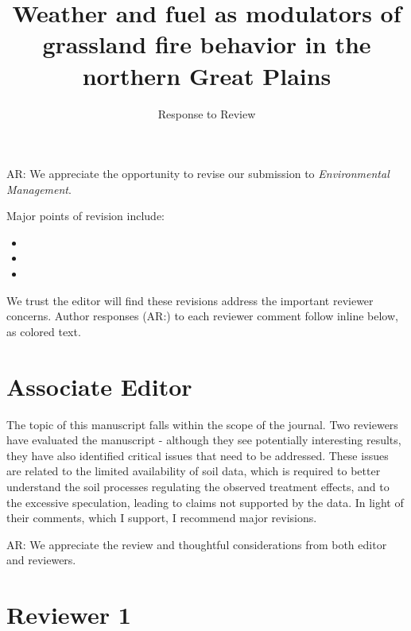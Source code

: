 \documentclass[parskip=half]{scrartcl}
\title{\Large Weather and fuel as modulators of grassland fire behavior in the northern Great Plains}
\subtitle{Response to Review}
\author{ }
\date{}
\newcommand{\AR}[1]
	{\color{PineGreen}AR: #1\color{black} \par }
\begin{document}
\maketitle

\vspace{-2cm} 

\AR{We appreciate the opportunity to revise our submission to \emph{Environmental Management}. 

Major points of revision include: 
\begin{itemize}
\item   
\item 
\item 

\end{itemize} 

We trust the editor will find these revisions address the important reviewer concerns. 
Author responses (AR:) to each reviewer comment follow inline below, as colored text. }

\section*{Associate Editor} 

The topic of this manuscript falls within the scope of the journal. Two reviewers have evaluated the manuscript - although they see potentially interesting results, they have also identified critical issues that need to be addressed. These issues are related to the limited availability of soil data, which is required to better understand the soil processes regulating the observed treatment effects, and to the excessive speculation, leading to claims not supported by the data. In light of their comments, which I support, I recommend major revisions.

\AR{We appreciate the review and thoughtful considerations from both editor and reviewers.} 


\section*{Reviewer 1}
\end{document}
